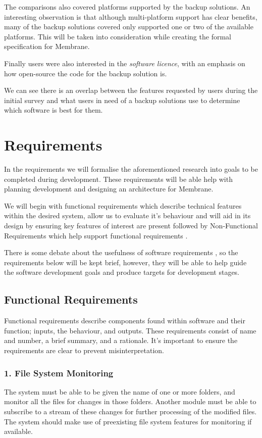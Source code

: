 \documentclass[11pt, a4paper, twocolumn, twoside]{report}
\begin{document}
The comparisons also covered platforms supported by the backup solutions. An interesting observation is that although multi-platform support has clear benefits, many of the backup solutions covered only supported one or two of the available platforms. This will be taken into consideration while creating the formal specification for Membrane.

Finally users were also interested in the \emph{software licence}, with an emphasis on how open-source the code for the backup solution is.

We can see there is an overlap between the features requested by users during the initial survey and what users in need of a backup solutions use to determine which software is best for them.

\section{Requirements}

In the requirements we will formalise the aforementioned research into goals to be completed during development. These requirements will be able help with planning development and designing an architecture for Membrane.

We will begin with functional requirements which describe technical features within the desired system, allow us to evaluate it's behaviour and will aid in its design by ensuring key features of interest are present \citep{van2009requirements} followed by Non-Functional Requirements which help support functional requirements \cite{chung2012non}.

There is some debate about the usefulness of software requirements \cite{kneuper1997limits}, so the requirements below will be kept brief, however, they will be able to help guide the software development goals and produce targets for development stages.

\subsection{Functional Requirements}

Functional requirements describe components found within software and their function; inputs, the behaviour, and outputs. These requirements consist of name and number, a brief summary, and a rationale. It's important to ensure the requirements are clear to prevent misinterpretation.

\subsubsection{1. File System Monitoring}
The system must be able to be given the name of one or more folders, and monitor all the files for changes in those folders. Another module must be able to subscribe to a stream of these changes for further processing of the modified files. The system should make use of preexisting file system features for monitoring if available.
\end{document}
